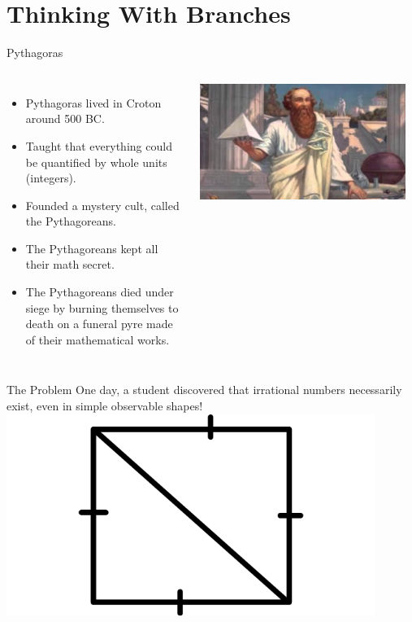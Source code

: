 \documentclass[]{beamer}
\begin{document}
\section{Thinking With Branches}
\begin{frame}{Pythagoras}
\begin{columns}
    \begin{itemize}[<+->]
        \item Pythagoras lived in Croton around 500 BC.
        \item Taught that everything could be quantified by whole
            units (integers).
        \item Founded a mystery cult, called the Pythagoreans.
        \item The Pythagoreans kept all their math secret.
        \item The Pythagoreans died under siege by burning themselves
            to death on a funeral pyre made of their mathematical works.
    \end{itemize}

    \includegraphics[width=0.95\textwidth]{images/pythagoras}
\end{columns}
\end{frame}

\begin{frame}{The Problem}
    One day, a student discovered that irrational numbers necessarily
    exist, even in simple observable shapes!
    \includegraphics[width=0.9\textwidth]{images/Irrational}
\end{frame}
\end{document}
